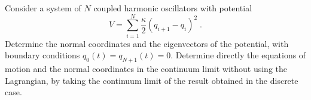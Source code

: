 \begin{ex} \label{Ex1} 
    Consider a system of $N$ coupled harmonic oscillators with potential
    \begin{equation}
        V = \sum_{i=1}^{N} \frac{\kappa}{2} (q_{i+1} - q_i)^2 \; .
        \label{Eq_ex1_V_def}
    \end{equation}
    Determine the normal coordinates and the eigenvectors of the potential, with boundary conditions $q_0(t) = q_{N+1}(t) = 0$. Determine directly the equations of motion and the normal coordinates in the continuum limit without using the Lagrangian, by taking the continuum limit of the result obtained in the discrete case.
\end{ex}



